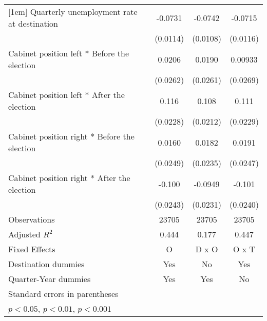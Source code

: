 \begin{table}[htbp]
\begin{tabular}{l*{3}{c}}
[1em]
Quarterly unemployment rate at destination&     -0.0731\sym{***}&     -0.0742\sym{***}&     -0.0715\sym{***}\\
                    &    (0.0114)         &    (0.0108)         &    (0.0116)         \\
[1em]
Cabinet position left * Before the election&      0.0206         &      0.0190         &     0.00933         \\
                    &    (0.0262)         &    (0.0261)         &    (0.0269)         \\
[1em]
Cabinet position left * After the election&       0.116\sym{***}&       0.108\sym{***}&       0.111\sym{***}\\
                    &    (0.0228)         &    (0.0212)         &    (0.0229)         \\
[1em]
Cabinet position right * Before the election&      0.0160         &      0.0182         &      0.0191         \\
                    &    (0.0249)         &    (0.0235)         &    (0.0247)         \\
[1em]
Cabinet position right * After the election&      -0.100\sym{***}&     -0.0949\sym{***}&      -0.101\sym{***}\\
                    &    (0.0243)         &    (0.0231)         &    (0.0240)         \\
\hline
Observations        &       23705         &       23705         &       23705         \\
Adjusted \(R^{2}\)  &       0.444         &       0.177         &       0.447         \\
Fixed Effects       &           O         &       D x O         &       O x T         \\
Destination dummies &         Yes         &          No         &         Yes         \\
Quarter-Year dummies&         Yes         &         Yes         &          No         \\
\hline\hline
\multicolumn{4}{l}{\footnotesize Standard errors in parentheses}\\
\multicolumn{4}{l}{\footnotesize \sym{*} \(p<0.05\), \sym{**} \(p<0.01\), \sym{***} \(p<0.001\)}\\
\end{tabular}
\end{table}

